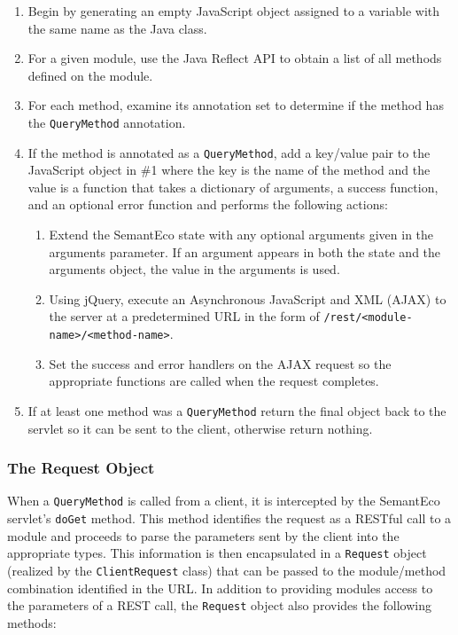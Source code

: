 \documentclass[letterpaper]{report}
\begin{document}
\begin{enumerate}
\item Begin by generating an empty JavaScript object assigned to a variable with the same name as the Java class.
\item For a given module, use the Java Reflect API to obtain a list of all methods defined on the module.
\item For each method, examine its annotation set to determine if the method has the \texttt{QueryMethod} annotation.
\item If the method is annotated as a \texttt{QueryMethod}, add a key/value pair to the JavaScript object in \#1 where the key is the name of the method and the value is a function that takes a dictionary of arguments, a success function, and an optional error function and performs the following actions:
\begin{enumerate}
\item Extend the SemantEco state with any optional arguments given in the arguments parameter. If an argument appears in both the state and the arguments object, the value in the arguments is used.
\item Using jQuery, execute an Asynchronous JavaScript and XML (AJAX) to the server at a predetermined URL in the form of \texttt{/rest/<module-name>/<method-name>}.
\item Set the success and error handlers on the AJAX request so the appropriate functions are called when the request completes.
\end{enumerate}
\item If at least one method was a \texttt{QueryMethod} return the final object back to the servlet so it can be sent to the client, otherwise return nothing.
\end{enumerate}

\subsubsection{The Request Object}
\label{request-object}
When a \texttt{QueryMethod} is called from a client, it is intercepted by the SemantEco servlet's \texttt{doGet} method. This method identifies the request as a RESTful call to a module and proceeds to parse the parameters sent by the client into the appropriate types. This information is then encapsulated in a \texttt{Request} object (realized by the \texttt{ClientRequest} class) that can be passed to the module/method combination identified in the URL. In addition to providing modules access to the parameters of a REST call, the \texttt{Request} object also provides the following methods:
\end{document}
